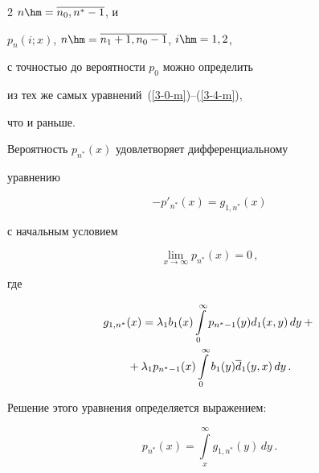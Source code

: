 \begin{multicols}{2}
$n\hm=\overline{n_0,n^*-1}$, и


$p_n(i;x)$, $n\hm=\overline{n_1+1,n_0-1}$, $i\hm=1,2$,


с точностью до вероятности $p_0$ можно определить


из тех же самых уравнений~(\ref{3-0-m})--(\ref{3-4-m}),


что и раньше.


Вероятность $p_{n^*}(x)$ удовлетворяет дифференциальному


уравнению


\begin{equation*}


-p'_{n^*}(x)= g_{1,n^*}(x) 


\end{equation*}


с начальным условием




\begin{equation*}




\lim\limits_{x\to\infty} p_{n^*}(x) = 0\,,


\end{equation*}




где




\begin{multline*}




g_{1,n^*}(x) = \lambda_1 b_1(x) \int\limits_0^\infty p_{n^*-1}(y) d_1(x,y)\, dy


+{}\\


{}+ \lambda_1 p_{n^*-1}(x) \int\limits_0^\infty b_1(y) \d_1(y,x)\, dy\,.


\end{multline*}




Решение этого уравнения определяется вы\-ра\-же\-нием:


\begin{equation*}




p_{n^*}(x)= \int\limits_x^\infty g_{1,n^*}(y)\, dy\,.


\end{equation*}



\end{multicols}
